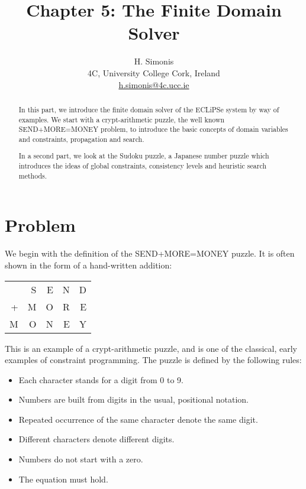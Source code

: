 \documentclass[a4paper]{article}
\begin{document}
\title{Chapter 5: The Finite Domain Solver}
\author{H. Simonis\\
4C, University College Cork, Ireland\\
\url{h.simonis@4c.ucc.ie}}

\maketitle

\begin{abstract}
In this part, we introduce the finite domain solver of the ECLiPSe system by way of examples. We start with a crypt-arithmetic puzzle, the well known SEND+MORE=MONEY problem, to introduce the basic concepts of domain variables and constraints, propagation and search.

In a second part, we look at the Sudoku puzzle, a Japanese number puzzle which introduces the ideas of global constraints, consistency levels and heuristic search methods.
\end{abstract}
\newpage
\tableofcontents
\newpage
{}

\section{Problem}
We begin with the definition of the SEND+MORE=MONEY puzzle. It is often shown in the form of a hand-written addition:

\vspace{0.5cm}
\begin{center}
\begin{tabular}{rrrrr}
  & S & E & N & D \\
+ & M & O & R & E \\ \hline
M & O & N & E & Y
\end{tabular}
\end{center}
\vspace{0.5cm}

This is an example of a crypt-arithmetic puzzle, and is one of the classical, early examples of constraint programming. The puzzle is defined by the following rules:

\begin{itemize}
\item Each character stands for a digit from 0 to 9.
\item Numbers are built from digits in the usual, positional notation. 
\item Repeated occurrence of the same character denote the same digit.
\item Different characters denote different digits.
\item Numbers do not start with a zero.
\item The equation must hold.
\end{itemize}
\end{document}
